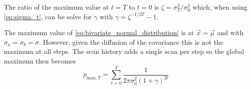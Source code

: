 The ratio of the maximum value at $t=T$ to $t=0$ is $\zeta= \sigma_T^2 / \sigma_0^2$ which, when using \eqref{eq:sigma_t}, can be solve for $\gamma$ with 
$\gamma = \zeta^{-1/2T} - 1$.


The maximum value of \eqref{eq:bivariate_normal_distribution} is at $\vec x = \vec \mu$ and with $\sigma_a = \sigma_b = \sigma$.
However, given the diffusion of the covariance this is not the maximum at all steps.
The scan history adds a single scan per step so the global maximum then becomes
\begin{equation}
    p_{\textrm{max},T} = \sum^T_{t=0} \frac{1}{2\pi\sigma_0^2(1+\gamma)^{2t}}
    \label{eq:bivariate_normal_distribution_max}
\end{equation}

